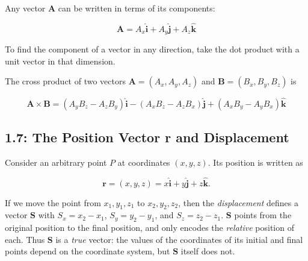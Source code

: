 \documentclass[12pt,twoside]{article}
\begin{document}
\begin{flushleft}
Any vector $\mathbf{A}$ can be written in terms of its components:

$$
\mathbf{A} = \mathit{A}_{x}\mathbf{\hat{i}} + \mathit{A}_{y}\mathbf{\hat{j}} + \mathit{A}_{z}\mathbf{\hat{k}}
$$

To find the component of a vector in any direction, take the dot product with a unit vector in that dimension.

The cross product of two vectors $\mathbf{A} = \left( \mathit{A}_{x}, \mathit{A}_{y}, \mathit{A}_{z} \right)$ and
$\mathbf{B} = \left( \mathit{B}_{x}, \mathit{B}_{y}, \mathit{B}_{z} \right)$ is

$$
\mathbf{A} \times \mathbf{B} = \left(\mathit{A}_{y}\mathit{B}_{z} - \mathit{A}_{z}\mathit{B}_{y} \right)\mathbf{\hat{i}} -
\left(\mathit{A}_{x}\mathit{B}_{z} - \mathit{A}_{z}\mathit{B}_{x} \right)\mathbf{\hat{j}} +
\left(\mathit{A}_{x}\mathit{B}_{y} - \mathit{A}_{y}\mathit{B}_{x} \right)\mathbf{\hat{k}}
$$

\subsection*{1.7: The Position Vector \textbf{r} and Displacement}

Consider an arbitrary point $\mathit{P}$ at coordinates $\left(\mathit{x}, \mathit{y}, \mathit{z}\right)$. Its position is written as

$$
\mathbf{r} = \left(\mathit{x}, \mathit{y}, \mathit{z}\right) = \mathit{x}\mathbf{\hat{i}} + \mathit{y}\mathbf{\hat{j}} + \mathit{z}\mathbf{\hat{k}}.
$$

If we move the point from $\mathit{x}_{1}, \mathit{y}_{1}, \mathit{z}_{1}$ to $\mathit{x}_{2}, \mathit{y}_{2}, \mathit{z}_{2}$, then the \textit{displacement}
defines a vector $\mathbf{S}$ with $\mathit{S}_{x} = \mathit{x}_{2} - \mathit{x}_{1}$, $\mathit{S}_{y} = \mathit{y}_{2} - \mathit{y}_{1}$, and
$\mathit{S}_{z} = \mathit{z}_{2} - \mathit{z}_{1}$. $\mathbf{S}$ points from the original position to the final position, and only encodes the \textit{relative}
position of each. Thus $\mathbf{S}$ is a \textit{true} vector: the values of the coordinates of its initial and final points depend on the coordinate system,
but $\mathbf{S}$ itself does not.


\end{flushleft}
\end{document}
